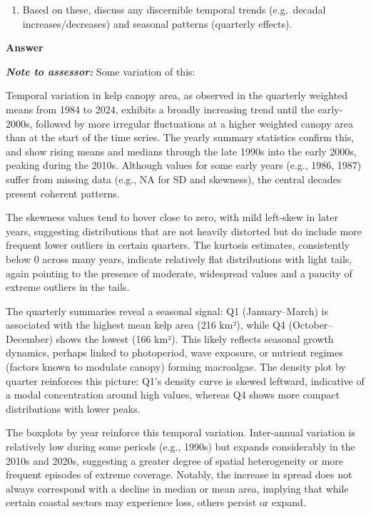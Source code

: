\documentclass[
  british,
  10pt,
]{article}
\providecommand{\tightlist}{%
  \setlength{\itemsep}{0pt}\setlength{\parskip}{0pt}}
\begin{document}
\begin{enumerate}
\def\labelenumi{\arabic{enumi}.}
\setcounter{enumi}{2}
\tightlist
\item
  Based on these, discuss any discernible temporal trends (e.g.~decadal
  increases/decreases) and seasonal patterns (quarterly effects).
\end{enumerate}

\textbf{Answer}

\textbf{\emph{Note to assessor:}} Some variation of this:

Temporal variation in kelp canopy area, as observed in the quarterly
weighted means from 1984 to 2024, exhibits a broadly increasing trend
until the early-2000s, followed by more irregular fluctuations at a
higher weighted canopy area than at the start of the time series. The
yearly summary statistics confirm this, and show rising means and
medians through the late 1990s into the early 2000s, peaking during the
2010s. Although values for some early years (e.g., 1986, 1987) suffer
from missing data (e.g., NA for SD and skewness), the central decades
present coherent patterns.

The skewness values tend to hover close to zero, with mild left-skew in
later years, suggesting distributions that are not heavily distorted but
do include more frequent lower outliers in certain quarters. The
kurtosis estimates, consistently below 0 across many years, indicate
relatively flat distributions with light tails, again pointing to the
presence of moderate, widespread values and a paucity of extreme
outliers in the tails.

The quarterly summaries reveal a seasonal signal: Q1 (January--March) is
associated with the highest mean kelp area (216 km²), while Q4
(October--December) shows the lowest (166 km²). This likely reflects
seasonal growth dynamics, perhaps linked to photoperiod, wave exposure,
or nutrient regimes (factors known to modulate canopy) forming
macroalgae. The density plot by quarter reinforces this picture: Q1's
density curve is skewed leftward, indicative of a modal concentration
around high values, whereas Q4 shows more compact distributions with
lower peaks.

The boxplots by year reinforce this temporal variation. Inter-annual
variation is relatively low during some periods (e.g., 1990s) but
expands considerably in the 2010s and 2020s, suggesting a greater degree
of spatial heterogeneity or more frequent episodes of extreme coverage.
Notably, the increase in spread does not always correspond with a
decline in median or mean area, implying that while certain coastal
sectors may experience loss, others persist or expand.
\end{document}

